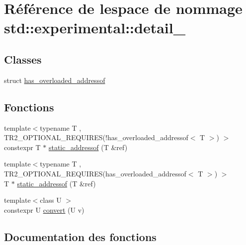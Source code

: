 \hypertarget{namespacestd_1_1experimental_1_1detail__}{}\section{Référence de l\textquotesingle{}espace de nommage std\+:\+:experimental\+:\+:detail\+\_\+}
\label{namespacestd_1_1experimental_1_1detail__}
\subsection*{Classes}
\begin{DoxyCompactItemize}
\item 
struct \hyperlink{structstd_1_1experimental_1_1detail___1_1has__overloaded__addressof}{has\+\_\+overloaded\+\_\+addressof}
\end{DoxyCompactItemize}
\subsection*{Fonctions}
\begin{DoxyCompactItemize}
\item 
{\footnotesize template$<$typename T , T\+R2\+\_\+\+O\+P\+T\+I\+O\+N\+A\+L\+\_\+\+R\+E\+Q\+U\+I\+R\+E\+S(!has\+\_\+overloaded\+\_\+addressof$<$ T $>$) $>$ }\\constexpr T $\ast$ \hyperlink{namespacestd_1_1experimental_1_1detail___aa205cc382da48555de424fc09d3286b1}{static\+\_\+addressof} (T \&ref)
\item 
{\footnotesize template$<$typename T , T\+R2\+\_\+\+O\+P\+T\+I\+O\+N\+A\+L\+\_\+\+R\+E\+Q\+U\+I\+R\+E\+S(has\+\_\+overloaded\+\_\+addressof$<$ T $>$) $>$ }\\T $\ast$ \hyperlink{namespacestd_1_1experimental_1_1detail___a9255e1a7ac3bf9c92e04e8fb4303f352}{static\+\_\+addressof} (T \&ref)
\item 
{\footnotesize template$<$class U $>$ }\\constexpr U \hyperlink{namespacestd_1_1experimental_1_1detail___a2a47800848ffd486b8ca82d2fbbb244d}{convert} (U v)
\end{DoxyCompactItemize}


\subsection{Documentation des fonctions}
\mbox{\label{namespacestd_1_1experimental_1_1detail___a2a47800848ffd486b8ca82d2fbbb244d}} 
